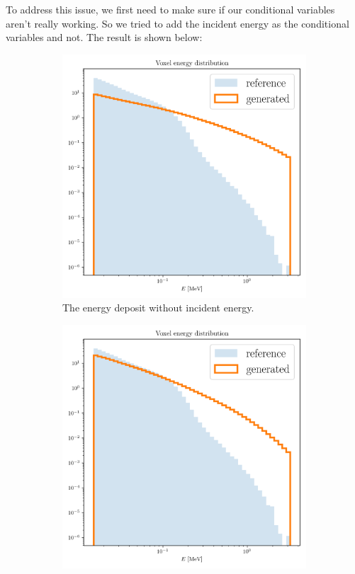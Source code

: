 To address this issue, we first need to make sure if our conditional variables aren't really working. So we tried to add the incident energy as the conditional variables and not. The result is shown below:

\begin{figure}[htbp]
    \centering
    \begin{subfigure}[b]{0.45\textwidth} %
        \includegraphics[width=\textwidth]{Figures/energy_deposit_without_incident.png}
        \caption{The energy deposit without incident energy.}
        \label{fig:without_incident}
    \end{subfigure}
    \hfill %
    \begin{subfigure}[b]{0.45\textwidth}
        \includegraphics[width=\textwidth]{Figures/energy_voxel_full.png}

\end{subfigure}
\end{figure}
